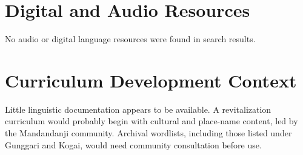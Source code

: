 \documentclass[12pt]{article}
\begin{document}
\section{Digital and Audio Resources}
No audio or digital language resources were found in search results.

\section{Curriculum Development Context}
Little linguistic documentation appears to be available. A revitalization curriculum would probably begin with cultural and place-name content, led by the Mandandanji community. Archival wordlists, including those listed under Gunggari and Kogai, would need community consultation before use.
\end{document}
